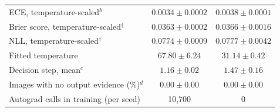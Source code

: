 \documentclass{article}
\begin{document}
\begin{table}[H]
\begin{tabular}{lcc}
\midrule
ECE, temperature-scaled$^b$ & $\boldsymbol{0.0034 \pm 0.0002}$ & $0.0038 \pm 0.0001$ \\
Brier score, temperature-scaled$^\dagger$ & $\boldsymbol{0.0363 \pm 0.0002}$ & $0.0366 \pm 0.0016$ \\
NLL, temperature-scaled$^\dagger$ & $\boldsymbol{0.0774 \pm 0.0009}$ & $0.0777 \pm 0.0042$ \\
Fitted temperature & $67.80 \pm 6.24$ & $31.14 \pm 0.42$ \\
\midrule
Decision step, mean$^c$ & $\boldsymbol{1.16 \pm 0.02}$ & $1.47 \pm 0.16$ \\
Images with no output evidence (\%)$^d$ & $0.00 \pm 0.00$ & $0.00 \pm 0.00$ \\
Autograd calls in training (per seed) & 10{,}700 & 0 \\
\bottomrule
\end{tabular}
\end{table}
\end{document}
